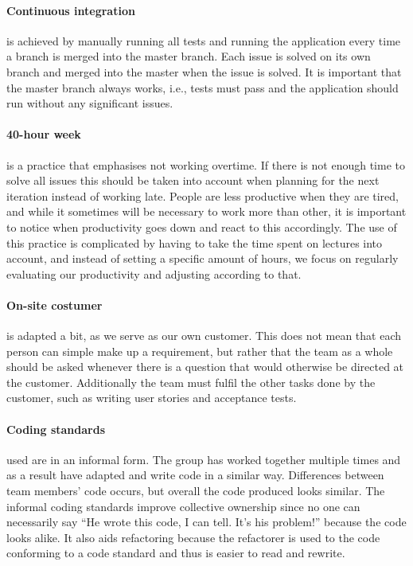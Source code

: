 \paragraph{Continuous integration} is achieved by manually running all tests and running the application every time a branch is merged into the master branch. Each issue is solved on its own branch and merged into the master when the issue is solved. It is important that the master branch always works, i.e., tests must pass and the application should run without any significant issues.

\paragraph{40-hour week} is a practice that emphasises not working overtime. If there is not enough time to solve all issues this should be taken into account when planning for the next iteration instead of working late. People are less productive when they are tired, and while it sometimes will be necessary to work more than other, it is important to notice when productivity goes down and react to this accordingly. The use of this practice is complicated by having to take the time spent on lectures into account, and instead of setting a specific amount of hours, we focus on regularly evaluating our productivity and adjusting according to that.
 
\paragraph{On-site costumer} is adapted a bit, as we serve as our own customer. This does not mean that each person can simple make up a requirement, but rather that the team as a whole should be asked whenever there is a question that would otherwise be directed at the customer. Additionally the team must fulfil the other tasks done by the customer, such as writing user stories and acceptance tests.

\paragraph{Coding standards} used are in an informal form. The group has worked together multiple times and as a result have adapted and write code in a similar way. Differences between team members' code occurs, but overall the code produced looks similar. The informal coding standards improve collective ownership since no one can necessarily say ``He wrote this code, I can tell. It's his problem!'' because the code looks alike. It also aids refactoring because the refactorer is used to the code conforming to a code standard and thus is easier to read and rewrite.
